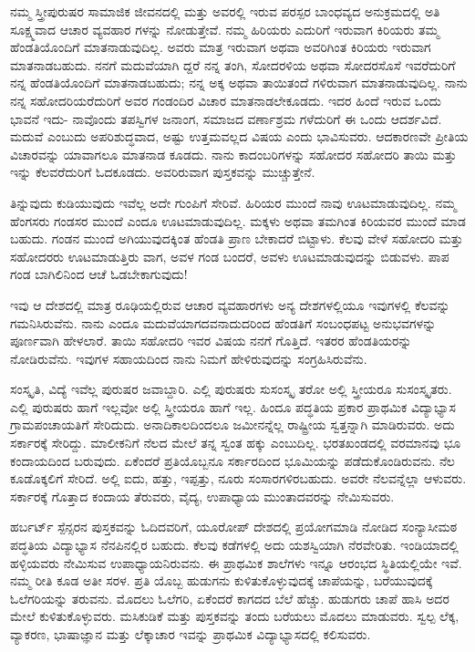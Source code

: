 ನಮ್ಮ ಸ್ತ್ರೀಪುರುಷರ ಸಾಮಾಜಿಕ ಜೀವನದಲ್ಲಿ ಮತ್ತು ಅವರಲ್ಲಿ ಇರುವ ಪರಸ್ಪರ ಬಾಂಧವ್ಯದ ಅನುಕ್ರಮದಲ್ಲಿ ಅತಿ ಸೂಕ್ಷ್ಮವಾದ ಆಚಾರ ವ್ಯವಹಾರ ಗಳನ್ನು ನೋಡುತ್ತೇವೆ. ನಮ್ಮ ಹಿರಿಯರು ಎದುರಿಗೆ ಇರುವಾಗ ಕಿರಿಯರು ತಮ್ಮ ಹೆಂಡತಿಯೊಂದಿಗೆ ಮಾತನಾಡುವುದಿಲ್ಲ. ಅವರು ಮಾತ್ರ ಇರುವಾಗ ಅಥವಾ ಅವರಿಗಿಂತ ಕಿರಿಯರು ಇರುವಾಗ ಮಾತನಾಡಬಹುದು. ನನಗೆ ಮದುವೆಯಾಗಿ ದ್ದರೆ ನನ್ನ ತಂಗಿ, ಸೋದರಳಿಯ ಅಥವಾ ಸೋದರಸೊಸೆ ಇವರೆದುರಿಗೆ ನನ್ನ ಹೆಂಡತಿಯೊಂದಿಗೆ ಮಾತನಾಡಬಹುದು; ನನ್ನ ಅಕ್ಕ ಅಥವಾ ತಾಯಿತಂದೆ ಗಳಿರುವಾಗ ಮಾತನಾಡುವುದಿಲ್ಲ. ನಾನು ನನ್ನ ಸಹೋದರಿಯರೆದುರಿಗೆ ಅವರ ಗಂಡಂದಿರ ವಿಚಾರ ಮಾತನಾಡಲೇಕೂಡದು. ಇದರ ಹಿಂದೆ ಇರುವ ಒಂದು ಭಾವನೆ ಇದು- ನಾವೊಂದು ತಪಸ್ವಿಗಳ ಜನಾಂಗ, ಸಮಾಜದ ವರ್ಣಾಶ್ರಮ ಗಳೆದುರಿಗೆ ಈ ಒಂದು ಆದರ್ಶವಿದೆ. ಮದುವೆ ಎಂಬುದು ಅಪರಿಶುದ್ಧವಾದ, ಅಷ್ಟು ಉತ್ತಮವಲ್ಲದ ವಿಷಯ ಎಂದು ಭಾವಿಸುವರು. ಆದಕಾರಣವೇ ಪ್ರೀತಿಯ ವಿಚಾರವನ್ನು ಯಾವಾಗಲೂ ಮಾತನಾಡ ಕೂಡದು. ನಾನು ಕಾದಂಬರಿಗಳನ್ನು ಸಹೋದರ ಸಹೋದರಿ ತಾಯಿ ಮತ್ತು ಇನ್ನು ಕೆಲವರೆದುರಿಗೆ ಓದಕೂಡದು. ಅವರಿರುವಾಗ ಪುಸ್ತಕವನ್ನು ಮುಚ್ಚುತ್ತೇನೆ.

ತಿನ್ನುವುದು ಕುಡಿಯುವುದು ಇವೆಲ್ಲ ಅದೇ ಗುಂಪಿಗೆ ಸೇರಿವೆ. ಹಿರಿಯರ ಮುಂದೆ ನಾವು ಊಟಮಾಡುವುದಿಲ್ಲ. ನಮ್ಮ ಹೆಂಗಸರು ಗಂಡಸರ ಮುಂದೆ ಎಂದೂ ಊಟಮಾಡುವುದಿಲ್ಲ. ಮಕ್ಕಳು ಅಥವಾ ತಮಗಿಂತ ಕಿರಿಯವರ ಮುಂದೆ ಮಾಡ ಬಹುದು. ಗಂಡನ ಮುಂದೆ ಅಗಿಯುವುದಕ್ಕಿಂತ ಹೆಂಡತಿ ಪ್ರಾಣ ಬೇಕಾದರೆ ಬಿಟ್ಟಾಳು. ಕೆಲವು ವೇಳೆ ಸಹೋದರಿ ಮತ್ತು ಸಹೋದರರು ಊಟಮಾಡುತ್ತಿರು ವಾಗ, ಅವಳ ಗಂಡ ಬಂದರೆ, ಅವಳು ಊಟಮಾಡುವುದನ್ನು ಬಿಡುವಳು. ಪಾಪ ಗಂಡ ಬಾಗಿಲಿನಿಂದ ಆಚೆ ಓಡಬೇಕಾಗುವುದು!

ಇವು ಆ ದೇಶದಲ್ಲಿ ಮಾತ್ರ ರೂಢಿಯಲ್ಲಿರುವ ಆಚಾರ ವ್ಯವಹಾರಗಳು ಅನ್ಯ ದೇಶಗಳಲ್ಲಿಯೂ ಇವುಗಳಲ್ಲಿ ಕೆಲವನ್ನು ಗಮನಿಸಿರುವೆನು. ನಾನು ಎಂದೂ ಮದುವೆಯಾಗದವನಾದುದರಿಂದ ಹೆಂಡತಿಗೆ ಸಂಬಂಧಪಟ್ಟ ಅನುಭವಗಳನ್ನು ಪೂರ್ಣವಾಗಿ ಹೇಳಲಾರೆ. ತಾಯಿ ಸಹೋದರಿ ಇವರ ವಿಷಯ ನನಗೆ ಗೊತ್ತಿದೆ. ಇತರರ ಹೆಂಡತಿಯರನ್ನು ನೋಡಿರುವೆನು. ಇವುಗಳ ಸಹಾಯದಿಂದ ನಾನು ನಿಮಗೆ ಹೇಳಿರುವುದನ್ನು ಸಂಗ್ರಹಿಸಿರುವೆನು.

ಸಂಸ್ಕೃತಿ, ವಿದ್ಯೆ ಇವೆಲ್ಲ ಪುರುಷರ ಜವಾಬ್ದಾರಿ. ಎಲ್ಲಿ ಪುರುಷರು ಸುಸಂಸ್ಕೃ ತರೋ ಅಲ್ಲಿ ಸ್ತ್ರೀಯರೂ ಸುಸಂಸ್ಕೃತರು. ಎಲ್ಲಿ ಪುರುಷರು ಹಾಗೆ ಇಲ್ಲವೋ ಅಲ್ಲಿ ಸ್ತ್ರೀಯರೂ ಹಾಗೆ ಇಲ್ಲ. ಹಿಂದೂ ಪದ್ಧತಿಯ ಪ್ರಕಾರ ಪ್ರಾಥಮಿಕ ವಿದ್ಯಾಭ್ಯಾಸ ಗ್ರಾಮಪಂಚಾಯತಿಗೆ ಸೇರಿದುದು. ಅನಾದಿಕಾಲದಿಂದಲೂ ಜಮೀನನ್ನೆಲ್ಲ ರಾಷ್ಟ್ರೀಯ ಸ್ವತ್ತನ್ನಾಗಿ ಮಾಡಿರುವರು. ಅದು ಸರ್ಕಾರಕ್ಕೆ ಸೇರಿದ್ದು. ಮಾಲೀಕನಿಗೆ ನೆಲದ ಮೇಲೆ ತನ್ನ ಸ್ವಂತ ಹಕ್ಕು ಎಂಬುದಿಲ್ಲ. ಭರತಖಂಡದಲ್ಲಿ ವರಮಾನವು ಭೂ ಕಂದಾಯದಿಂದ ಬರುವುದು. ಏಕೆಂದರೆ ಪ್ರತಿಯೊಬ್ಬನೂ ಸರ್ಕಾರದಿಂದ ಭೂಮಿಯನ್ನು ಪಡೆದುಕೊಂಡಿರುವನು. ನೆಲ ಕೂಡೊಕ್ಕಲಿಗೆ ಸೇರಿದೆ. ಅಲ್ಲಿ ಐದು, ಹತ್ತು, ಇಪ್ಪತ್ತು, ನೂರು ಸಂಸಾರಗಳಿರಬಹುದು. ಅವರೇ ನೆಲವನ್ನೆಲ್ಲಾ ಆಳುವರು. ಸರ್ಕಾರಕ್ಕೆ ಗೊತ್ತಾದ ಕಂದಾಯ ತೆರುವರು, ವೈದ್ಯ, ಉಪಾಧ್ಯಾಯ ಮುಂತಾದವರನ್ನು ನೇಮಿಸುವರು.

ಹರ್ಬರ್ಟ್​ ಸ್ಪೆನ್ಸರನ ಪುಸ್ತಕವನ್ನು ಓದಿದವರಿಗೆ, ಯೂರೋಪ್​ ದೇಶದಲ್ಲಿ ಪ್ರಯೋಗಮಾಡಿ ನೋಡಿದ ಸಂನ್ಯಾಸೀಮಠ ಪದ್ಧತಿಯ ವಿದ್ಯಾಭ್ಯಾಸ ನೆನಪಿನಲ್ಲಿರ ಬಹುದು. ಕೆಲವು ಕಡೆಗಳಲ್ಲಿ ಅದು ಯಶಸ್ವಿಯಾಗಿ ನೆರವೇರಿತು. ಇಂಡಿಯಾದಲ್ಲಿ ಹಳ್ಳಿಯವರು ನೇಮಿಸುವ ಉಪಾಧ್ಯಾಯನಿರುವನು. ಈ ಪ್ರಾಥಮಿಕ ಶಾಲೆಗಳು ಇನ್ನೂ ಆರಂಭದ ಸ್ಥಿತಿಯಲ್ಲಿಯೇ ಇವೆ. ನಮ್ಮ ರೀತಿ ಕೂಡ ಅತೀ ಸರಳ. ಪ್ರತಿ ಯೊಬ್ಬ ಹುಡುಗನು ಕುಳಿತುಕೊಳ್ಳುವುದಕ್ಕೆ ಚಾಪೆಯನ್ನು, ಬರೆಯುವುದಕ್ಕೆ ಓಲೆಗರಿಯನ್ನು ತರುವನು. ಮೊದಲು ಓಲೆಗರಿ, ಏಕೆಂದರೆ ಕಾಗದದ ಬೆಲೆ ಹೆಚ್ಚು. ಹುಡುಗರು ಚಾಪೆ ಹಾಸಿ ಅದರ ಮೇಲೆ ಕುಳಿತುಕೊಳ್ಳುವರು. ಮಸಿಕುಡಿಕೆ ಮತ್ತು ಪುಸ್ತಕವನ್ನು ತಂದು ಬರೆಯಲು ಮೊದಲು ಮಾಡುವರು. ಸ್ವಲ್ಪ ಲೆಕ್ಕ, ವ್ಯಾಕರಣ, ಭಾಷಾಜ್ಞಾನ ಮತ್ತು ಲೆಕ್ಕಾಚಾರ ಇವನ್ನು ಪ್ರಾಥಮಿಕ ವಿದ್ಯಾಭ್ಯಾಸದಲ್ಲಿ ಕಲಿಸುವರು.

